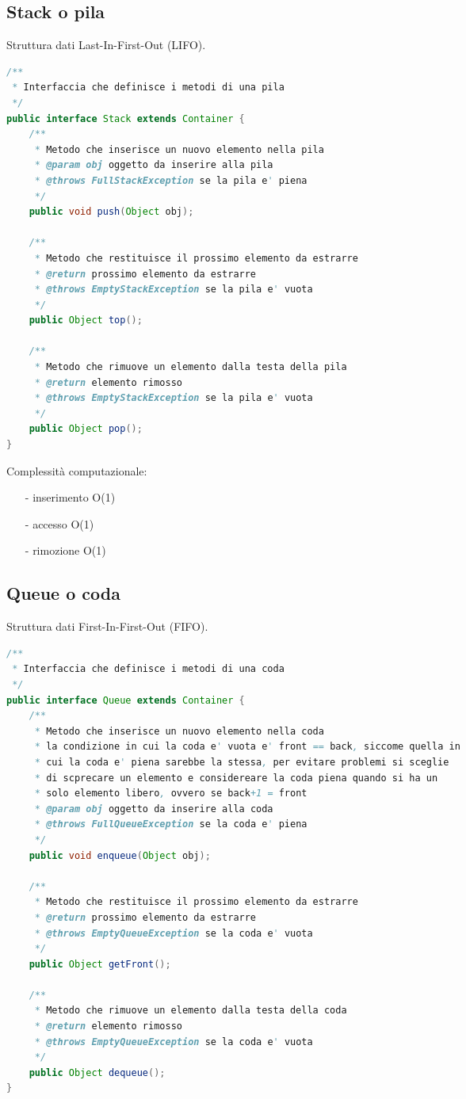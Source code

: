 \documentclass[a4paper]{article}
\begin{document}
\subsection{Stack o pila}
Struttura dati Last-In-First-Out (LIFO).

\begin{lstlisting}[language=Java]
/**
 * Interfaccia che definisce i metodi di una pila
 */
public interface Stack extends Container {
	/**
	 * Metodo che inserisce un nuovo elemento nella pila
	 * @param obj oggetto da inserire alla pila
	 * @throws FullStackException se la pila e' piena
	 */
	public void push(Object obj);

	/**
	 * Metodo che restituisce il prossimo elemento da estrarre
	 * @return prossimo elemento da estrarre
	 * @throws EmptyStackException se la pila e' vuota
	 */
	public Object top();
	
	/**
	 * Metodo che rimuove un elemento dalla testa della pila
	 * @return elemento rimosso
	 * @throws EmptyStackException se la pila e' vuota
	 */
	public Object pop();
}
\end{lstlisting}

Complessità computazionale:
\begin{itemize} [topsep=3pt, itemsep=0pt]
	\item[-] inserimento O(1)
	\item[-] accesso O(1)
	\item[-] rimozione O(1)
\end{itemize}

\newpage

\subsection{Queue o coda}
Struttura dati First-In-First-Out (FIFO).
\begin{lstlisting}[language=Java]
/**
 * Interfaccia che definisce i metodi di una coda
 */
public interface Queue extends Container {
	/**
	 * Metodo che inserisce un nuovo elemento nella coda
	 * la condizione in cui la coda e' vuota e' front == back, siccome quella in
	 * cui la coda e' piena sarebbe la stessa, per evitare problemi si sceglie
	 * di scprecare un elemento e considereare la coda piena quando si ha un
	 * solo elemento libero, ovvero se back+1 = front
	 * @param obj oggetto da inserire alla coda
	 * @throws FullQueueException se la coda e' piena
	 */
	public void enqueue(Object obj);

	/**
	 * Metodo che restituisce il prossimo elemento da estrarre
	 * @return prossimo elemento da estrarre
	 * @throws EmptyQueueException se la coda e' vuota
	 */
	public Object getFront();
	
	/**
	 * Metodo che rimuove un elemento dalla testa della coda
	 * @return elemento rimosso
	 * @throws EmptyQueueException se la coda e' vuota
	 */
	public Object dequeue();
}   
\end{lstlisting}
\end{document}
